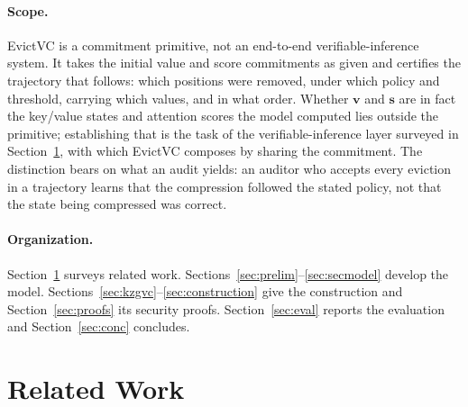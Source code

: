 \documentclass[version=submission]{iacrcc}
\theoremstyle{definition}
\begin{document}
\paragraph{Scope.}
EvictVC is a commitment primitive, not an end-to-end verifiable-inference
system. It takes the initial value and score commitments as given and certifies
the trajectory that follows: which positions were removed, under which policy
and threshold, carrying which values, and in what order. Whether $\mathbf{v}$
and $\mathbf{s}$ are in fact the key/value states and attention scores the model
computed lies outside the primitive; establishing that is the task of the
verifiable-inference layer surveyed in Section~\ref{sec:related}, with which
EvictVC composes by sharing the commitment. The distinction bears on what an
audit yields: an auditor who accepts every eviction in a trajectory learns that
the compression followed the stated policy, not that the state being compressed
was correct.

\paragraph{Organization.}
Section~\ref{sec:related} surveys related work. Sections~\ref{sec:prelim}--\ref{sec:secmodel}
develop the model. Sections~\ref{sec:kzgvc}--\ref{sec:construction} give the
construction and Section~\ref{sec:proofs} its security proofs.
Section~\ref{sec:eval} reports the evaluation and Section~\ref{sec:conc}
concludes.

\section{Related Work}\label{sec:related}
\end{document}
